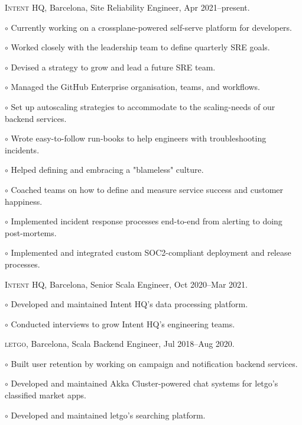 \documentclass[letterpaper]{article}
\renewenvironment{itemize}{
  \begin{list}{}{
    \setlength{\leftmargin}{1.5em}
  }
}{
  \end{list}
}
\newenvironment{no-indent-itemize}{
  \begin{list}{}{
    \setlength{\leftmargin}{0em}
  }
}{
  \end{list}
}
\def\bullet{$\circ$\xspace}
\begin{document}
\begin{no-indent-itemize}
  \item \textsc{Intent HQ}, Barcelona, Site Reliability Engineer, Apr 2021--present.
  \begin{itemize}
    \item\bullet Currently working on a crossplane-powered self-serve platform for developers.
    \item\bullet Worked closely with the leadership team to define quarterly SRE goals.
    \item\bullet Devised a strategy to grow and lead a future SRE team.
    \item\bullet Managed the GitHub Enterprise organisation, teams, and workflows.    
    \item\bullet Set up autoscaling strategies to accommodate to the scaling-needs of our backend services.
    \item\bullet Wrote easy-to-follow run-books to help engineers with troubleshooting incidents.
    \item\bullet Helped defining and embracing a "blameless" culture.
    \item\bullet Coached teams on how to define and measure service success and customer happiness.
    \item\bullet Implemented incident response processes end-to-end from alerting to doing post-mortems.
    \item\bullet Implemented and integrated custom SOC2-compliant deployment and release processes.
  \end{itemize}
  \item \textsc{Intent HQ}, Barcelona, Senior Scala Engineer, Oct 2020--Mar 2021.
  \begin{itemize}
    \item\bullet Developed and maintained Intent HQ's data processing platform.
    \item\bullet Conducted interviews to grow Intent HQ's engineering teams.
  \end{itemize}
  \item \textsc{letgo}, Barcelona, Scala Backend Engineer, Jul 2018--Aug 2020.
  \begin{itemize}
    \item\bullet Built user retention by working on campaign and notification backend services.
    \item\bullet Developed and maintained Akka Cluster-powered chat systems for letgo's classified market apps.
    \item\bullet Developed and maintained letgo's searching platform.

\end{itemize}
\end{no-indent-itemize}
\end{document}
